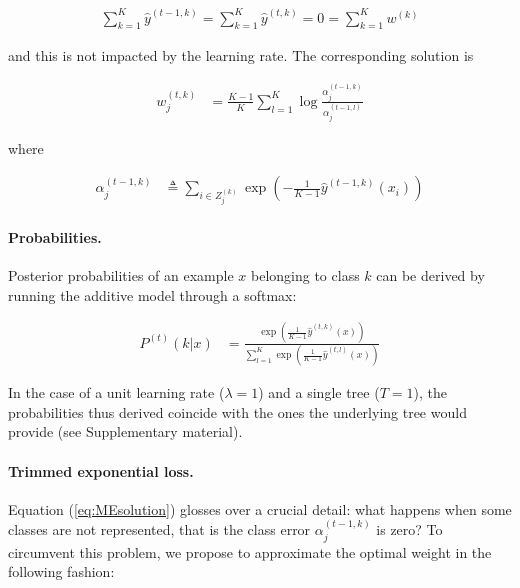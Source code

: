 \documentclass{article}
\begin{document}
\vspace*{-\baselineskip}
\begin{align}\label{eq:MEzeroSum}
\sum_{k=1}^{K} \hat{y}^{(t-1, k)} = \sum_{k=1}^{K} 
\hat{y}^{(t, k)} = 0 = \sum_{k=1}^{K} w^{(k)}
\end{align}
\vspace*{-\baselineskip}

and this is not impacted by the learning rate. The corresponding solution is

\vspace*{-\baselineskip}
\begin{align}\label{eq:MEsolution}
w_j^{(t,k)} &= \frac{K-1}{K}  \sum_{l=1}^{K} \log \frac{\alpha_j^{(t-1, 
k)}}{\alpha_j^{(t-1, l)}}
\end{align}
\vspace*{-\baselineskip}

where

\vspace*{-\baselineskip}
\begin{align}\label{eq:MEClsErrZS}
\alpha_j^{(t-1, k)} &\triangleq \sum_{i \in Z_j^{(k)}} \exp \left( 
-\frac{1}{K-1} \hat{y}^{(t-1, k)}(x_i) \right) 
\end{align}
\vspace*{-\baselineskip}

\paragraph{Probabilities.}
Posterior probabilities of an example $x$ belonging to class $k$ can be derived 
by running the additive model through a softmax:

\vspace*{-\baselineskip}
\begin{align}\label{eq:MEproba}
P^{(t)}(k|x) &= \frac{\exp \left(\frac{1}{K-1} \hat{y}^{(t, k)}(x) 
\right)}{\sum_{l=1}^K\exp \left(\frac{1}{K-1} \hat{y}^{(t, l)}(x) \right)}
\end{align}
\vspace*{-\baselineskip}

In the case of a unit learning rate ($\lambda = 1$) and a single tree ($T=1$), 
the probabilities thus derived coincide with the ones the underlying tree would 
provide (see Supplementary material).


\paragraph{Trimmed exponential loss.}
Equation (\ref{eq:MEsolution}) glosses over a crucial detail: what happens when 
some classes are not represented, that is the class error $\alpha_j^{(t-1, k)}$ 
is zero? To circumvent this problem, we propose to approximate the optimal 
weight in the following fashion:
\end{document}
